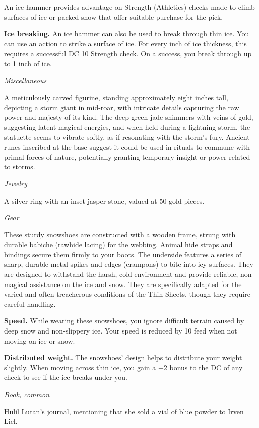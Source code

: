 \documentclass[
  letterpaper,12pt,twoside,twocolumn,openany,
  nodeprecatedcode,bg=full]{dndbook}
\begin{document}
An ice hammer provides advantage on Strength (Athletics) checks made to
climb surfaces of ice or packed snow that offer suitable purchase for
the pick.

\textbf{Ice breaking.} An ice hammer can also be used to break through
thin ice. You can use an action to strike a surface of ice. For every
inch of ice thickness, this requires a successful DC 10 Strength check.
On a success, you break through up to 1 inch of ice.

{\emph{Miscellaneous}}

A meticulously carved figurine, standing approximately eight inches
tall, depicting a storm giant in mid-roar, with intricate details
capturing the raw power and majesty of its kind. The deep green jade
shimmers with veins of gold, suggesting latent magical energies, and
when held during a lightning storm, the statuette seems to vibrate
softly, as if resonating with the storm's fury. Ancient runes inscribed
at the base suggest it could be used in rituals to commune with primal
forces of nature, potentially granting temporary insight or power
related to storms.

{\emph{Jewelry}}

A silver ring with an inset jasper stone, valued at 50 gold pieces.

{\emph{Gear}}

These sturdy snowshoes are constructed with a wooden frame, strung with
durable babiche (rawhide lacing) for the webbing. Animal hide straps and
bindings secure them firmly to your boots. The underside features a
series of sharp, durable metal spikes and edges (crampons) to bite into
icy surfaces. They are designed to withstand the harsh, cold environment
and provide reliable, non-magical assistance on the ice and snow. They
are specifically adapted for the varied and often treacherous conditions
of the Thin Sheets, though they require careful handling.

\textbf{Speed.} While wearing these snowshoes, you ignore difficult
terrain caused by deep snow and non-slippery ice. Your speed is reduced
by 10 feed when not moving on ice or snow.

\textbf{Distributed weight.} The snowshoes' design helps to distribute
your weight slightly. When moving across thin ice, you gain a +2 bonus
to the DC of any check to see if the ice breaks under you.

{\emph{Book, common}}

Hulil Lutan's journal, mentioning that she sold a vial of blue powder to
Irven Liel.
\end{document}
